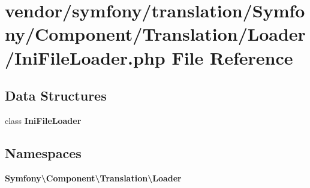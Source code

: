 \section{vendor/symfony/translation/\+Symfony/\+Component/\+Translation/\+Loader/\+Ini\+File\+Loader.php File Reference}
\label{_ini_file_loader_8php}
\subsection*{Data Structures}
\begin{DoxyCompactItemize}
\item 
class {\bf Ini\+File\+Loader}
\end{DoxyCompactItemize}
\subsection*{Namespaces}
\begin{DoxyCompactItemize}
\item 
 {\bf Symfony\textbackslash{}\+Component\textbackslash{}\+Translation\textbackslash{}\+Loader}
\end{DoxyCompactItemize}
